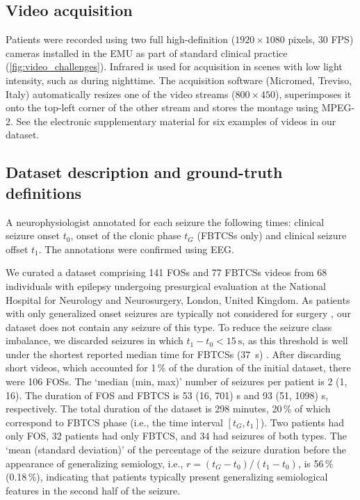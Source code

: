 \subsection{Video acquisition}

Patients were recorded using two full high-definition ($1920 \times 1080$ pixels, 30 \ac{FPS}) cameras installed in the \ac{EMU} as part of standard clinical practice (\cref{fig:video_challenges}).
Infrared is used for acquisition in scenes with low light intensity, such as during nighttime.
The acquisition software (Micromed, Treviso, Italy) automatically resizes one of the video streams ($800 \times 450$), superimposes it onto the top-left corner of the other stream and stores the montage using MPEG-2.
See the electronic supplementary material%
for six examples of videos in our dataset.


\subsection{Dataset description and ground-truth definitions}
\label{sec:dataset}

A neurophysiologist annotated for each seizure the following times: clinical seizure onset $t_0$, onset of the clonic phase $t_G$ (\acp{FBTCS} only) and clinical seizure offset $t_1$.
The annotations were confirmed using \ac{EEG}.

We curated a dataset comprising 141 \acp{FOS} and 77 \acp{FBTCS} videos from 68 individuals with epilepsy undergoing presurgical evaluation at the National Hospital for Neurology and Neurosurgery, London, United Kingdom.
As patients with only generalized onset seizures are typically not considered for surgery \cite{duncan_brain_2016}, our dataset does not contain any seizure of this type.  %
To reduce the seizure class imbalance, we discarded seizures in which $t_1 - t_0 < \SI{15}{\second}$, as this threshold is well under the shortest reported median time for \acp{FBTCS} (\SI{37}{\second}) \cite{jenssen_how_2006}.
After discarding short videos, which accounted for 1\,\% of the duration of the initial dataset, there were 106 \acp{FOS}.
The `median (min, max)' number of seizures per patient is 2 (1, 16).
The duration of \ac{FOS} and \ac{FBTCS} is 53 (16, 701) s and 93 (51, 1098) s, respectively.
The total duration of the dataset is 298 minutes, 20\,\% of which correspond to \ac{FBTCS} phase (i.e., the time interval $[t_G, t_1]$).
Two patients had only \ac{FOS}, 32 patients had only \ac{FBTCS}, and 34 had seizures of both types.
The `mean (standard deviation)' of the percentage of the seizure duration before the appearance of generalizing semiology, i.e., $r = (t_G - t_0) / (t_1 - t_0)$, is 56\,\% (0.18\,\%), indicating that patients typically present generalizing semiological features in the second half of the seizure.

